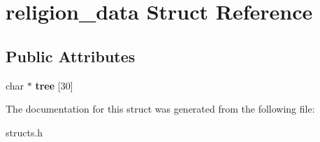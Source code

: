\hypertarget{structreligion__data}{\section{religion\-\_\-data Struct Reference}
\label{structreligion__data}
}
\subsection*{Public Attributes}
\begin{DoxyCompactItemize}
\item 
\hypertarget{structreligion__data_af20c3418eafaf370977184fa21c8fd4f}{char $\ast$ {\bfseries tree} \mbox{[}30\mbox{]}}\label{structreligion__data_af20c3418eafaf370977184fa21c8fd4f}

\end{DoxyCompactItemize}


The documentation for this struct was generated from the following file\-:\begin{DoxyCompactItemize}
\item 
structs.\-h\end{DoxyCompactItemize}
